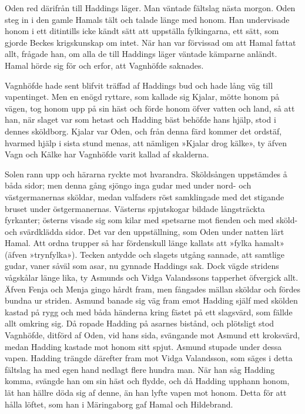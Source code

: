 Oden red därifrån till Haddings läger. Man väntade fältslag nästa
morgon. Oden steg in i den gamle Hamals tält
och talade länge med honom. Han undervisade honom i ett ditintills icke
kändt sätt att uppställa fylkingarna, ett sätt, som gjorde Beckes
krigskunskap om intet. När han var förvissad om att Hamal fattat allt,
frågade han, om alla de till Haddings läger väntade kämparne anländt.
Hamal hörde sig för och erfor, att Vagnhöfde saknades.

Vagnhöfde hade sent blifvit träffad af Haddings bud och hade lång väg
till vapentinget. Men en enögd ryttare, som kallade sig Kjalar, mötte
honom på vägen, tog honom upp på sin häst och förde honom öfver vatten
och land, så att han, när slaget var som hetast och Hadding bäst behöfde
hans hjälp, stod i dennes sköldborg. Kjalar var Oden, och från denna
färd kommer det ordstäf, hvarmed hjälp i sista stund menas, att nämligen
»Kjalar drog kälke», ty äfven Vagn och Kälke har Vagnhöfde varit kallad
af skalderna.

Solen rann upp och härarna ryckte mot hvarandra. Sköldsången uppstämdes
å båda sidor; men denna gång sjöngo inga gudar med under nord- och
västgermanernas sköldar, medan valfaders röst samklingade med det
stigande bruset under östgermanernas. Västerns spjutskogar bildade
långsträckta fyrkanter; österns visade sig som kilar med spetsarne mot
fienden och med sköld- och svärdklädda sidor. Det var den uppställning,
som Oden under natten lärt Hamal. Att ordna trupper så har fördenskull
länge kallats att »fylka hamalt» (äfven »trynfylka»). Tecken antydde och
slagets utgång sannade, att samtlige gudar, vaner såväl som asar, nu
gynnade Haddings sak. Dock vägde stridens vågskålar länge lika, ty
Asmunds och Vidga Valandssons tapperhet öfvergick allt. Äfven Fenja och
Menja gingo hårdt fram, men fångades mällan sköldar och fördes bundna ur
striden. Asmund banade sig väg fram emot Hadding själf med skölden
kastad på rygg och med båda händerna kring fästet på ett slagsvärd, som
fällde allt omkring sig. Då ropade Hadding på asarnes bistånd, och
plötsligt stod Vagnhöfde, ditförd af Oden, vid hans sida, svängande mot
Asmund ett kroksvärd, medan Hadding kastade mot honom sitt spjut. Asmund
stupade under
dessa vapen. Hadding trängde därefter fram mot Vidga Valandsson, som
säges i detta fältslag ha med egen hand nedlagt flere hundra man. När
han såg Hadding komma, svängde han om sin häst och flydde, och då
Hadding upphann honom, lät han hällre döda sig af denne, än han lyfte
vapen mot honom. Detta för att hålla löftet, som han i Märingaborg gaf
Hamal och Hildebrand.

